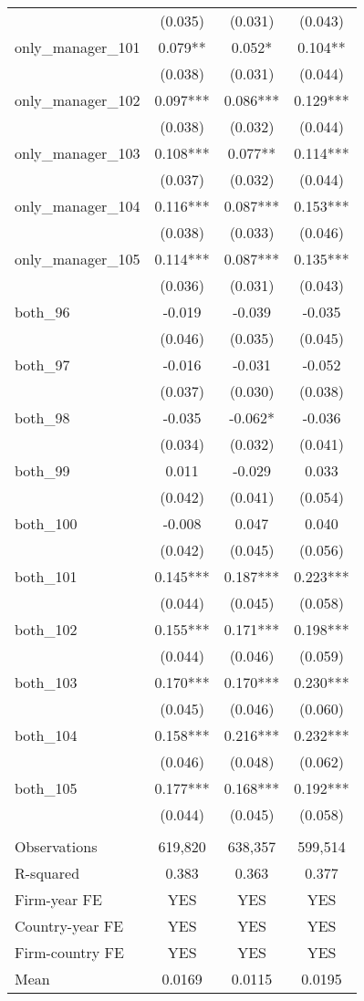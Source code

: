 \begin{tabular}{lccc}
 & (0.035) & (0.031) & (0.043) \\
only\_manager\_101 & 0.079** & 0.052* & 0.104** \\
 & (0.038) & (0.031) & (0.044) \\
only\_manager\_102 & 0.097*** & 0.086*** & 0.129*** \\
 & (0.038) & (0.032) & (0.044) \\
only\_manager\_103 & 0.108*** & 0.077** & 0.114*** \\
 & (0.037) & (0.032) & (0.044) \\
only\_manager\_104 & 0.116*** & 0.087*** & 0.153*** \\
 & (0.038) & (0.033) & (0.046) \\
only\_manager\_105 & 0.114*** & 0.087*** & 0.135*** \\
 & (0.036) & (0.031) & (0.043) \\
both\_96 & -0.019 & -0.039 & -0.035 \\
 & (0.046) & (0.035) & (0.045) \\
both\_97 & -0.016 & -0.031 & -0.052 \\
 & (0.037) & (0.030) & (0.038) \\
both\_98 & -0.035 & -0.062* & -0.036 \\
 & (0.034) & (0.032) & (0.041) \\
both\_99 & 0.011 & -0.029 & 0.033 \\
 & (0.042) & (0.041) & (0.054) \\
both\_100 & -0.008 & 0.047 & 0.040 \\
 & (0.042) & (0.045) & (0.056) \\
both\_101 & 0.145*** & 0.187*** & 0.223*** \\
 & (0.044) & (0.045) & (0.058) \\
both\_102 & 0.155*** & 0.171*** & 0.198*** \\
 & (0.044) & (0.046) & (0.059) \\
both\_103 & 0.170*** & 0.170*** & 0.230*** \\
 & (0.045) & (0.046) & (0.060) \\
both\_104 & 0.158*** & 0.216*** & 0.232*** \\
 & (0.046) & (0.048) & (0.062) \\
both\_105 & 0.177*** & 0.168*** & 0.192*** \\
 & (0.044) & (0.045) & (0.058) \\
 &  &  &  \\
Observations & 619,820 & 638,357 & 599,514 \\
R-squared & 0.383 & 0.363 & 0.377 \\
Firm-year FE & YES & YES & YES \\
Country-year FE & YES & YES & YES \\
Firm-country FE & YES & YES & YES \\
 Mean & 0.0169 & 0.0115 & 0.0195 \\ \hline
\end{tabular}
